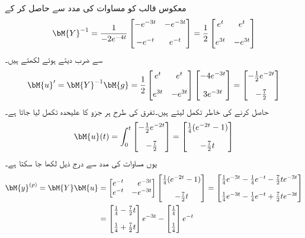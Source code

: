  معکوس قالب کو مساوات  کی مدد سے حاصل کر کے
\begin{align*}
\bM{Y}^{-1}=\frac{1}{-2e^{-4t}}\begin{bmatrix} -e^{-3t} & -e^{-3t}\\[1em] -e^{-t}& e^{-t} \end{bmatrix}=
\frac{1}{2}\begin{bmatrix} e^{t} & e^{t}\\[1em] e^{3t}& -e^{3t}   \end{bmatrix}
\end{align*}
 سے ضرب دیتے ہوئے  لکھتے ہیں۔
\begin{align*}
\bM{u}'=\bM{Y}^{-1}\bM{g}=\frac{1}{2}\begin{bmatrix} e^{t} & e^{t}\\[1em] e^{3t}& -e^{3t}   \end{bmatrix}\begin{bmatrix} -4e^{-3t} \\[1em] 3e^{-3t} \end{bmatrix} =\begin{bmatrix}-\frac{1}{2}e^{-2t}\\[1em] -\frac{7}{2}\end{bmatrix}
\end{align*}
 حاصل کرنے کی خاطر تکمل لیتے ہیں۔تفرق کی طرح ہر جزو کا علیحدہ تکمل لیا جاتا ہے۔
\begin{align*}
\bM{u}(t)=\int_{0}^{t}\begin{bmatrix}-\frac{1}{2}e^{-2t}\\[1em] -\frac{7}{2}\end{bmatrix}=\begin{bmatrix} \frac{1}{4}(e^{-2t}-1) \\[1em] -\frac{7}{2}t \end{bmatrix}
\end{align*}
یوں مساوات  کی مدد سے درج ذیل لکھا جا سکتا ہے۔
\begin{align*}
\bM{y}^{(p)}=\bM{Y}\bM{u}&=\begin{bmatrix*}[r] e^{-t}&e^{-3t} \\ e^{-t} &-e^{-3t} \end{bmatrix*}\begin{bmatrix} \frac{1}{4}(e^{-2t}-1) \\[1em] -\frac{7}{2}t \end{bmatrix}=\begin{bmatrix}\frac{1}{4}e^{-3t}-\frac{1}{4}e^{-t}-\frac{7}{2}te^{-3t}\\[1em] \frac{1}{4}e^{-3t}-\frac{1}{4}e^{-t}+\frac{7}{2}te^{-3t}  \end{bmatrix}\\
&=\begin{bmatrix} \frac{1}{4}-\frac{7}{2}t \\[1em] \frac{1}{4}+\frac{7}{2}t \end{bmatrix}e^{-3t}-\begin{bmatrix}\frac{1}{4}\\[1em] \frac{1}{4}  \end{bmatrix}e^{-t}
\end{align*}
